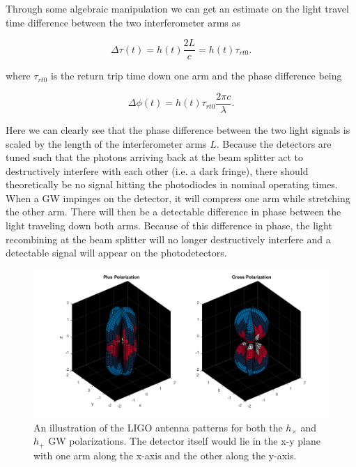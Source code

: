 Through some algebraic manipulation we can get an estimate on the 
light travel time difference between the two interferometer 
arms as 

\begin{equation}
    \Delta \tau(t) = h(t) \frac{2L}{c} = h(t) \tau_{rt0}.
\end{equation}

%
%
where $\tau_{rt0}$ is the return trip time down 
one arm and the phase difference being 

\begin{equation}
    \Delta \phi(t) = h(t) \tau_{rt0} \frac{2\pi c}{\lambda}.
\end{equation}

Here we can clearly see that the phase difference 
between the two light signals is scaled by the 
length of the interferometer arms $L$. Because the 
detectors are tuned such that the photons arriving 
back at the beam splitter act to destructively 
interfere with each other (i.e. a dark fringe), there should theoretically 
be no signal hitting the photodiodes in nominal operating times. When a \ac{GW} 
impinges on the detector, it will compress one arm 
while stretching the other arm. There will then be a 
detectable difference in phase between the light traveling 
down both arms. Because of this difference in phase, the 
light recombining at the beam splitter will no longer 
destructively interfere and a detectable signal will appear 
on the photodetectors.

\begin{figure}
    \centering
    \includegraphics[width=\linewidth]{figures/peanut.png}
    \caption[Illustration of the \ac{LIGO} antenna patterns for both the $h_\times$ and $h_+$ \ac{GW} polarizations]{An illustration of the \ac{LIGO} antenna patterns for both the $h_\times$ and $h_+$ \ac{GW} polarizations. The detector itself would lie in the x-y plane with one arm along the x-axis and the other along the y-axis.}
    \label{fig:gw_plus_cross}
\end{figure}

